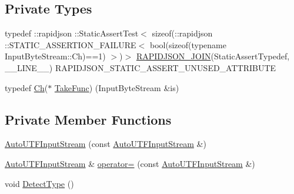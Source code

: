 \subsection*{Private Types}
\begin{DoxyCompactItemize}
\item 
typedef \+::rapidjson \+::Static\+Assert\+Test$<$ sizeof(\+::rapidjson \+::S\+T\+A\+T\+I\+C\+\_\+\+A\+S\+S\+E\+R\+T\+I\+O\+N\+\_\+\+F\+A\+I\+L\+U\+RE$<$ bool(sizeof(typename Input\+Byte\+Stream\+::\+Ch)==1) $>$)$>$ \mbox{\hyperlink{classrapidjson_1_1_auto_u_t_f_input_stream_ae19959155f693249ce5df05f6eb619a9}{R\+A\+P\+I\+D\+J\+S\+O\+N\+\_\+\+J\+O\+IN}}(Static\+Assert\+Typedef, \+\_\+\+\_\+\+L\+I\+N\+E\+\_\+\+\_\+) R\+A\+P\+I\+D\+J\+S\+O\+N\+\_\+\+S\+T\+A\+T\+I\+C\+\_\+\+A\+S\+S\+E\+R\+T\+\_\+\+U\+N\+U\+S\+E\+D\+\_\+\+A\+T\+T\+R\+I\+B\+U\+TE
\item 
typedef \mbox{\hyperlink{classrapidjson_1_1_auto_u_t_f_input_stream_a6d9eca095f7ef8c249ebe43568d66d0e}{Ch}}($\ast$ \mbox{\hyperlink{classrapidjson_1_1_auto_u_t_f_input_stream_a26a3023cacf9438e5403dee700a7a5c1}{Take\+Func}}) (Input\+Byte\+Stream \&is)
\end{DoxyCompactItemize}
\subsection*{Private Member Functions}
\begin{DoxyCompactItemize}
\item 
\mbox{\hyperlink{classrapidjson_1_1_auto_u_t_f_input_stream_acbc09440ae650326041e4cdaba2697f8}{Auto\+U\+T\+F\+Input\+Stream}} (const \mbox{\hyperlink{classrapidjson_1_1_auto_u_t_f_input_stream}{Auto\+U\+T\+F\+Input\+Stream}} \&)
\item 
\mbox{\hyperlink{classrapidjson_1_1_auto_u_t_f_input_stream}{Auto\+U\+T\+F\+Input\+Stream}} \& \mbox{\hyperlink{classrapidjson_1_1_auto_u_t_f_input_stream_ae10ac18c3643f0be39d9007a72fa8a9c}{operator=}} (const \mbox{\hyperlink{classrapidjson_1_1_auto_u_t_f_input_stream}{Auto\+U\+T\+F\+Input\+Stream}} \&)
\item 
void \mbox{\hyperlink{classrapidjson_1_1_auto_u_t_f_input_stream_a72887a6cd8306adc4140eee3ffa7df63}{Detect\+Type}} ()
\end{DoxyCompactItemize}

